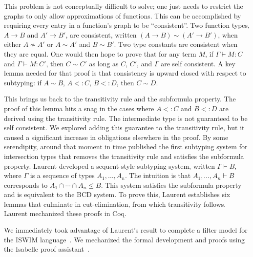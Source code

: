 \documentclass{article}
\begin{document}
This problem is not conceptually difficult to solve; one just needs to
restrict the graphs to only allow approximations of functions. This
can be accomplished by requiring every entry in a function's graph to
be ``consistent''. Two function types, $A \to B$ and $A' \to B'$, are
consistent, written $(A \to B) \sim (A' \to B')$, when either $A
\not\sim A'$ or $A \sim A'$ and $B \sim B'$. Two type constants are
consistent when they are equal. One would then hope to prove that for
any term $M$, if $\Gamma \vdash M : C$ and $\Gamma \vdash M : C'$,
then $C \sim C'$ as long as $C$, $C'$, and $\Gamma$ are self
consistent. A key lemma needed for that proof is that consistency is
upward closed with respect to subtyping: if $A \sim B$, $A <: C$, $B
<: D$, then $C \sim D$.

This brings us back to the transitivity rule and the subformula
property. The proof of this lemma hits a snag in the cases where $A <:
C$ and $B <: D$ are derived using the transitivity rule. The
intermediate type is not guaranteed to be self consistent. We explored
adding this guarantee to the transitivity rule, but it caused a
significant increase in obligations elsewhere in the proof. By some
serendipity, around that moment in time \citet{Laurent:2018aa}
published the first subtyping system for intersection types that
removes the transitivity rule and satisfies the subformula property.
Laurent developed a sequent-style subtyping system, written $\Gamma
\vdash B$, where $\Gamma$ is a sequence of types $A_1,\ldots,A_n$. The
intuition is that $A_1,\ldots,A_n \vdash B$ corresponds to $A_1 \cap
\cdots \cap A_n \leq B$. This system satisfies the subformula property
and is equivalent to the BCD system. To prove this, Laurent
establishes six lemmas that culminate in cut-elimination, from which
transitivity follows. Laurent mechanized these proofs in Coq.

We immediately took advantage of Laurent's result to complete a filter
model for the ISWIM
language~\citep{Landin:1966la,G.-D.-Plotkin:1975on,Felleisen:2009aa}.
We mechanized the formal development and proofs using the Isabelle
proof assistant~\citep{Siek:2018aa}.
\end{document}
